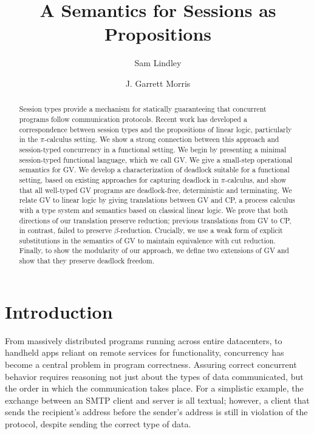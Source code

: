 \documentclass[oribibl,orivec,envcountsame]{llncs}
\title{A Semantics for Sessions as Propositions}
\author{Sam Lindley \and J. Garrett Morris}
\institute{The University of Edinburgh \\
           \email{\{Sam.Lindley,Garrett.Morris\}@ed.ac.uk} \vspace{-5mm}}
\begin{document}
\maketitle

\begin{abstract}
  Session types provide a mechanism for statically guaranteeing that concurrent programs follow
  communication protocols.  Recent work has developed a correspondence between session types and the
  propositions of linear logic, particularly in the $\pi$-calculus setting.
%
  We show a strong connection between this approach and session-typed concurrency in a functional
  setting.
%
  We begin by presenting a minimal session-typed functional language, which we call GV.  We give a
  small-step operational semantics for GV.  We develop a characterization of deadlock suitable for a
  functional setting, based on existing approaches for capturing deadlock in $\pi$-calculus, and
  show that all well-typed GV programs are deadlock-free, deterministic and terminating.
%
  We relate GV to linear logic by giving translations between GV and CP, a process calculus with a
  type system and semantics based on classical linear logic.  We prove that both directions of our
  translation preserve reduction; previous translations from GV to CP, in contrast, failed to
  preserve $\beta$-reduction. Crucially, we use a weak form of explicit substitutions in the
  semantics of GV to maintain equivalence with cut reduction.
%
  Finally, to show the modularity of our approach, we define two extensions of GV and show that they
  preserve deadlock freedom.
\end{abstract}

\section{Introduction}\label{sec:intro}

From massively distributed programs running across entire datacenters, to handheld apps reliant on
remote services for functionality, concurrency has become a central problem in program
correctness. Assuring correct concurrent behavior requires reasoning not just about the types of
data communicated, but the order in which the communication takes place. For a simplistic example,
the exchange between an SMTP client and server is all textual; however, a client that sends the
recipient's address before the sender's address is still in violation of the protocol, despite
sending the correct type of data.
\end{document}
